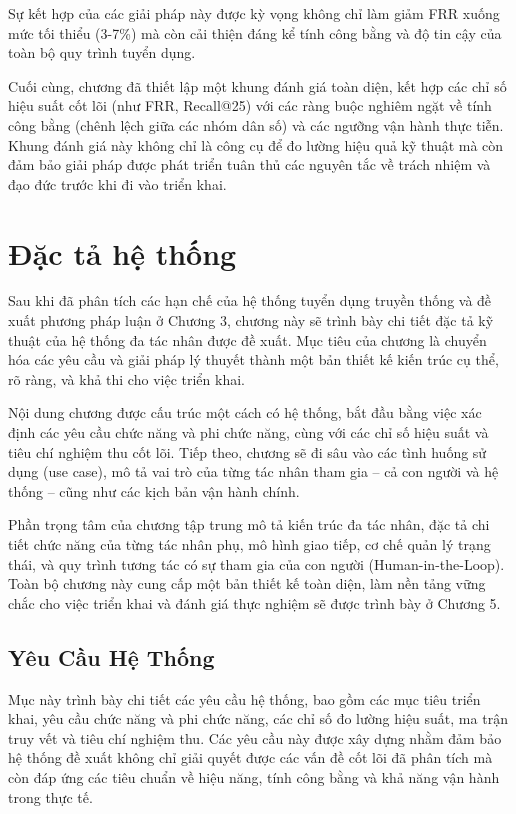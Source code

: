 \documentclass{article}
\newcommand{\nocontentsline}[3]{}
\newcommand{\tocless}[2]{\bgroup\let\addcontentsline=\nocontentsline#1{#2}\egroup}
\begin{document}
Sự kết hợp của các giải pháp này được kỳ vọng không chỉ làm giảm FRR xuống mức tối thiểu (3-7\%) mà còn cải thiện đáng kể tính công bằng và độ tin cậy của toàn bộ quy trình tuyển dụng.

Cuối cùng, chương đã thiết lập một khung đánh giá toàn diện, kết hợp các chỉ số hiệu suất cốt lõi (như FRR, Recall@25) với các ràng buộc nghiêm ngặt về tính công bằng (chênh lệch giữa các nhóm dân số) và các ngưỡng vận hành thực tiễn. Khung đánh giá này không chỉ là công cụ để đo lường hiệu quả kỹ thuật mà còn đảm bảo giải pháp được phát triển tuân thủ các nguyên tắc về trách nhiệm và đạo đức trước khi đi vào triển khai.

\newpage
\tocless\section{Đặc tả hệ thống}
\addcontentsline{toc}{section}{\numberline{}CHƯƠNG 4: ĐẶC TẢ HỆ THỐNG}
\setcounter{section}{4}
Sau khi đã phân tích các hạn chế của hệ thống tuyển dụng truyền thống và đề xuất phương pháp luận ở Chương 3, chương này sẽ trình bày chi tiết đặc tả kỹ thuật của hệ thống đa tác nhân được đề xuất. Mục tiêu của chương là chuyển hóa các yêu cầu và giải pháp lý thuyết thành một bản thiết kế kiến trúc cụ thể, rõ ràng, và khả thi cho việc triển khai.

Nội dung chương được cấu trúc một cách có hệ thống, bắt đầu bằng việc xác định các yêu cầu chức năng và phi chức năng, cùng với các chỉ số hiệu suất và tiêu chí nghiệm thu cốt lõi. Tiếp theo, chương sẽ đi sâu vào các tình huống sử dụng (use case), mô tả vai trò của từng tác nhân tham gia – cả con người và hệ thống – cũng như các kịch bản vận hành chính.

Phần trọng tâm của chương tập trung mô tả kiến trúc đa tác nhân, đặc tả chi tiết chức năng của từng tác nhân phụ, mô hình giao tiếp, cơ chế quản lý trạng thái, và quy trình tương tác có sự tham gia của con người (Human-in-the-Loop). Toàn bộ chương này cung cấp một bản thiết kế toàn diện, làm nền tảng vững chắc cho việc triển khai và đánh giá thực nghiệm sẽ được trình bày ở Chương 5.
\vspace{14pt}
\setcounter{subsection}{0}
\setcounter{table}{0}
\setcounter{figure}{0}
\subsection{Yêu Cầu Hệ Thống}
Mục này trình bày chi tiết các yêu cầu hệ thống, bao gồm các mục tiêu triển khai, yêu cầu chức năng và phi chức năng, các chỉ số đo lường hiệu suất, ma trận truy vết và tiêu chí nghiệm thu. Các yêu cầu này được xây dựng nhằm đảm bảo hệ thống đề xuất không chỉ giải quyết được các vấn đề cốt lõi đã phân tích mà còn đáp ứng các tiêu chuẩn về hiệu năng, tính công bằng và khả năng vận hành trong thực tế.
\end{document}
